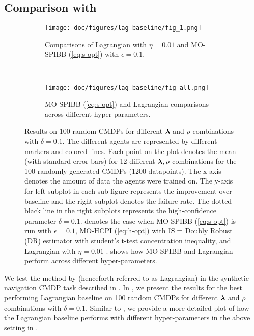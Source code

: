 \subsection{Comparison with \cite{le2019batch}}
\label{app:lag-baseline}



\begin{figure}[t]
\centering
\begin{subfigure}[b]{1\textwidth}
    \texttt{[image: doc/figures/lag-baseline/fig\_1.png]}
    \caption{Comparisons of Lagrangian \citep{le2019batch} with $\eta = 0.01$ and MO-SPIBB (\ref{eq:s-opt}) with $\epsilon=0.1$.}
    \label{fig:lag-only-single-sopt} 
\end{subfigure}
\\
\begin{subfigure}[b]{1\textwidth}
    \texttt{[image: doc/figures/lag-baseline/fig\_all.png]}
    \caption{MO-SPIBB (\cref{eq:s-opt}) and Lagrangian \citep{le2019batch} comparisons across different hyper-parameters.}
    \label{fig:lag-multiple-sopt}
\end{subfigure}
\caption[]{
\small
Results on 100 random CMDPs for different $\bm{\lambda}$ and $\rho$ combinations with $\delta=0.1$. The different agents are represented by different markers and colored lines. Each point on the plot denotes the mean (with standard error bars) for 12 different $\bm{\lambda},\rho$ combinations for the 100 randomly generated CMDPs (1200 datapoints).  The x-axis denotes the amount of data the agents were trained on. 
The y-axis for left subplot in each sub-figure represents the improvement over baseline and the right subplot denotes the failure rate. The dotted black line in the right subplots represents the high-confidence parameter $\delta=0.1$.
 denotes the case when MO-SPIBB (\ref{eq:s-opt}) is run with $\epsilon=0.1$, MO-HCPI (\ref{eq:h-opt}) with $\text{IS}=$ Doubly Robust (DR) estimator with student's t-test concentration inequality, and Lagrangian \citep{le2019batch} with $\eta = 0.01$ . 
 shows how MO-SPIBB and Lagrangian perform across different hyper-parameters.
\label{fig:lag-combined-results}}
\vskip -0.1in
\end{figure}



We test the method by \cite{le2019batch} (henceforth referred to as Lagrangian) in the synthetic navigation CMDP task described in . In , we present the results for the best performing Lagrangian baseline on 100 random CMDPs for different $\bm{\lambda}$ and $\rho$ combinations with $\delta=0.1$. Similar to , we provide a more detailed plot of how the Lagrangian baseline performs with different hyper-parameters in the above setting in .



